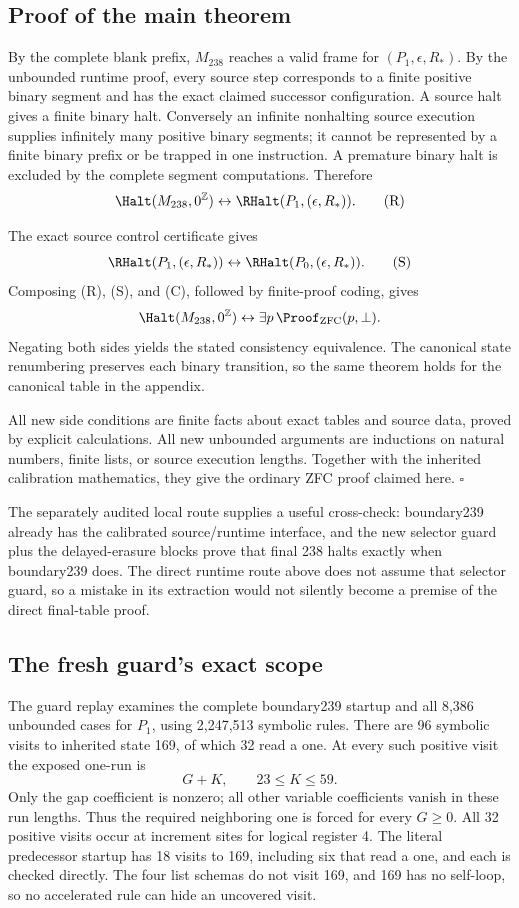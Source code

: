 \subsection{Proof of the main theorem}

By the complete blank prefix, $M_{238}$ reaches a valid frame for
$(P_1,\epsilon,R_*)$. By the unbounded runtime proof, every source step
corresponds to a finite positive binary segment and has the exact
claimed successor configuration. A source halt gives a finite binary
halt. Conversely an infinite nonhalting source execution supplies
infinitely many positive binary segments; it cannot be represented
by a finite binary prefix or be trapped in one instruction. A premature
binary halt is excluded by the complete segment computations. Therefore
\[
       \Halt(M_{238},0^{\mathbb Z})
       \leftrightarrow \RHalt(P_1,(\epsilon,R_*)).
\tag{R}
\]

The exact source control certificate gives
\[
       \RHalt(P_1,(\epsilon,R_*))
       \leftrightarrow \RHalt(P_0,(\epsilon,R_*)).
\tag{S}
\]
Composing (R), (S), and (C), followed by finite-proof coding, gives
\[
       \Halt(M_{238},0^{\mathbb Z})
       \leftrightarrow \exists p\,\Proof_{\mathrm{ZFC}}(p,\bot).
\]
Negating both sides yields the stated consistency equivalence. The
canonical state renumbering preserves each binary transition, so the
same theorem holds for the canonical table in the appendix.

All new side conditions are finite facts about exact tables and source
data, proved by explicit calculations. All new unbounded arguments are
inductions on natural numbers, finite lists, or source execution lengths.
Together with the inherited calibration mathematics, they give the
ordinary ZFC proof claimed here. \hfill$\square$

The separately audited local route supplies a useful cross-check:
boundary239 already has the calibrated source/runtime interface, and
the new selector guard plus the delayed-erasure blocks prove that
final 238 halts exactly when boundary239 does. The direct runtime route
above does not assume that selector guard, so a mistake in its extraction
would not silently become a premise of the direct final-table proof.

\subsection{The fresh guard's exact scope}

The guard replay examines the complete boundary239 startup and all 8,386
unbounded cases for $P_1$, using 2,247,513 symbolic rules. There are 96
symbolic visits to inherited state 169, of which 32 read a one. At every
such positive visit the exposed one-run is
\[
                         G+K,\qquad23\le K\le59.
\]
Only the gap coefficient is nonzero; all other variable coefficients
vanish in these run lengths. Thus the required neighboring one is
forced for every $G\ge0$. All 32 positive visits occur at increment
sites for logical register 4. The literal predecessor startup has 18
visits to 169, including six that read a one, and each is checked directly.
The four list schemas do not visit 169, and 169 has no self-loop, so no
accelerated rule can hide an uncovered visit.

